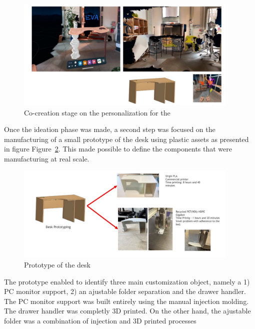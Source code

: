 \documentclass[
  11pt,
]{article}
\begin{document}
\begin{figure}[H]

{\centering \includegraphics[width=0.95\textwidth,height=\textheight]{figures/demos/desk/desk-00.jpg}

}

\caption{\label{fig-desk-00}Co-creation stage on the personalization for
the}

\end{figure}

Once the ideation phase was made, a second step was focused on the
manufacturing of a small prototype of the desk using plastic assets as
presented in figure Figure~\ref{fig-desk-01}. This made possible to
define the components that were manufacturing at real scale.

\begin{figure}[H]

{\centering \includegraphics[width=0.95\textwidth,height=\textheight]{figures/demos/desk/desk-01.jpg}

}

\caption{\label{fig-desk-01}Prototype of the desk}

\end{figure}

The prototype enabled to identify three main customization object,
namely a 1) PC monitor support, 2) an ajustable folder separation and
the drawer handler. The PC monitor support was built entirely using the
manual injection molding. The drawer handler was completly 3D printed.
On the other hand, the ajustable folder was a combination of injection
and 3D printed processes
\end{document}
